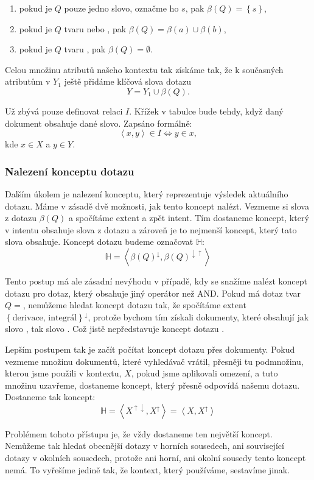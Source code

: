 \documentclass[12pt]{article}
\newcommand{\sssection}[1]{\subsubsection{#1}}
\newcommand{\adds}[1]{\left\{#1\right\}}
\newcommand{\addsp}[1]{\left<#1\right>}
\newcommand{\up}{^{\uparrow}}
\newcommand{\down}{^{\downarrow}}
\newcommand{\updown}{^{\uparrow\downarrow}}
\newcommand{\downup}{^{\downarrow\uparrow}}
\newcommand{\hledany}{\mathbb{H}}
\begin{document}
\begin{enumerate}
	\item pokud je $Q$ pouze jedno slovo, označme ho $s$, pak $\beta(Q)=\adds{s}$,
	\item pokud je $Q$ tvaru  nebo , pak $\beta(Q)=\beta(a)\cup\beta(b)$,
	\item pokud je $Q$ tvaru , pak $\beta(Q)=\emptyset$.
\end{enumerate}

Celou množinu atributů našeho kontextu tak získáme tak, že k současných atributům v $Y_1$ ještě přidáme klíčová slova dotazu
$$
Y=Y_1\cup\beta(Q).
$$

Už zbývá pouze definovat relaci $I$. Křížek v tabulce bude tehdy, když daný dokument obsahuje dané slovo. Zapsáno formálně:
$$
\addsp{x,y} \in I \iff y \in x,
$$
kde $x \in X$ a $y \in Y$.

\sssection{Nalezení konceptu dotazu}
Dalším úkolem je nalezení konceptu, který reprezentuje výsledek aktuálního dotazu. Máme v zásadě dvě možnosti, jak tento koncept nalézt. Vezmeme si slova z dotazu $\beta(Q)$ a spočítáme extent a zpět intent. Tím dostaneme koncept, který v intentu obsahuje slova z dotazu a zároveň je to nejmenší koncept, který tato slova obsahuje. Koncept dotazu budeme označovat $\hledany$:
$$
\hledany=\addsp{\beta(Q)\down, \beta(Q)\downup}
$$

Tento postup má ale zásadní nevýhodu v případě, kdy se snažíme nalézt koncept dotazu pro dotaz, který obsahuje jiný operátor než AND. Pokud má dotaz tvar $Q=$, nemůžeme hledat koncept dotazu tak, že spočítáme extent $\adds{\mbox{derivace, integrál}}\down$, protože bychom tím získali dokumenty, které obsahují jak slovo , tak slovo . Což jistě nepředstavuje koncept dotazu .

Lepším postupem tak je začít počítat koncept dotazu přes dokumenty. Pokud vezmeme množinu dokumentů, které vyhledávač vrátil, přesněji tu podmnožinu, kterou jsme použili v kontextu, $X$, pokud jsme aplikovali omezení, a tuto množinu uzavřeme, dostaneme koncept, který přesně odpovídá našemu dotazu. Dostaneme tak koncept:
$$
\hledany=\addsp{X\updown, X\up}=\addsp{X, X\up}
$$

Problémem tohoto přístupu je, že vždy dostaneme ten největší koncept. Nemůžeme tak hledat obecnější dotazy v horních sousedech, ani související dotazy v okolních sousedech, protože ani horní, ani okolní sousedy tento koncept nemá. To vyřešíme jedině tak, že kontext, který používáme, sestavíme jinak. 
\end{document}
